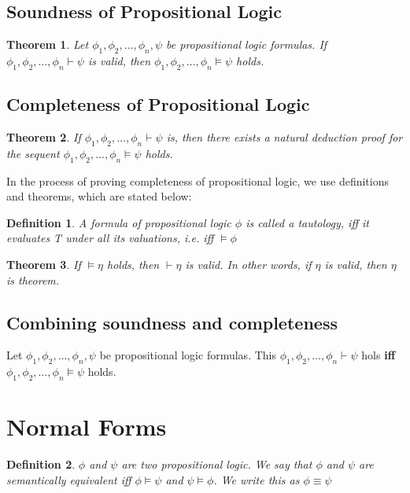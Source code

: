 \documentclass{report}
\newtheorem{theorem}{Theorem}
\newtheorem{definition}{Definition}[chapter]
\begin{document}
\subsection{Soundness of Propositional Logic}
\begin{theorem}
Let $\phi_1, \phi_2,\ldots, \phi_n, \psi$ be propositional logic formulas. If $\phi_1, \phi_2,\ldots, \phi_n \vdash \psi$ is valid, then $\phi_1, \phi_2,\ldots, \phi_n \vDash \psi$ holds. 
\end{theorem}

\subsection{Completeness of Propositional Logic}
\begin{theorem}
If $\phi_1, \phi_2,\ldots, \phi_n \vdash \psi$ is, then there exists a natural deduction proof for the sequent $\phi_1, \phi_2,\ldots, \phi_n \vDash \psi$ holds. 
\end{theorem}
In the process of proving completeness of propositional logic, we use definitions and theorems, which are stated below:
\begin{definition}{}
A formula of propositional logic $\phi$ is called a tautology, iff it evaluates T under all its valuations, i.e. iff $\vDash \phi$  
\end{definition}

\begin{theorem}
If $\vDash \eta$ holds, then $\vdash \eta$ is valid. In other words, if $\eta$ is valid, then $\eta$ is theorem.
\end{theorem}

\subsection{Combining soundness and completeness}
Let $\phi_1, \phi_2,\ldots, \phi_n, \psi$ be propositional logic formulas. This $\phi_1, \phi_2,\ldots, \phi_n \vdash \psi$ hols \textbf{iff} $\phi_1, \phi_2,\ldots, \phi_n \vDash \psi$ holds. 
\section{Normal Forms}
\begin{definition}
    $\phi$ and $\psi$ are two propositional logic. We say that $\phi$ and $\psi$ are semantically equivalent iff $\phi \vDash \psi$ and $\psi \vDash \phi$.
    We write this as $\phi \equiv \psi$
\end{definition}
\end{document}
